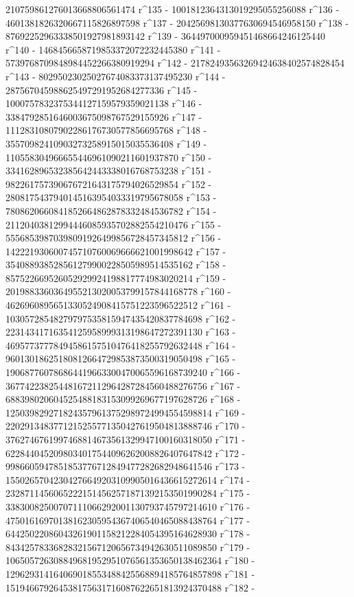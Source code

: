        210759861276013668806561474 r^135 - 
       1001812364313019295055256088 r^136 - 
       4601381826320667115826897598 r^137 - 
       20425698130377630694546958150 r^138 - 
       87692252963338501927981893142 r^139 - 
       364497000959451468664246125440 r^140 - 
       1468456658719853372072232445380 r^141 - 
       5739768709848984452266380919294 r^142 - 
       21782493563269424638402574828454 r^143 - 
       80295023025027674083373137495230 r^144 - 
       287567045988625497291952684277336 r^145 - 
       1000757832375344127159579359021138 r^146 - 
       3384792851646003675098767529155926 r^147 - 
       11128310807902286176730577856695768 r^148 - 
       35570982410903273258915015035536408 r^149 - 
       110558304966655446961090211601937870 r^150 - 
       334162896532385642443338016768753238 r^151 - 
       982261757390676721643175794026529854 r^152 - 
       2808175437940145163954033319795678058 r^153 - 
       7808620660841852664862878332484536782 r^154 - 
       21120403812994446085935702882554210476 r^155 - 
       55568539870398091926499856728457345812 r^156 - 
       142221930600745710760069666621001998642 r^157 - 
       354088938528561279900228505989514535162 r^158 - 
       857522669526052929924198817774983020214 r^159 - 
       2019883360364955213020053799157844168778 r^160 - 
       4626960895651330524908415751223596522512 r^161 - 
       10305728548279797535815947435420837784698 r^162 - 
       22314341716354125958999313198647272391130 r^163 - 
       46957737778494586157510476418255792632448 r^164 - 
       96013018625180812664729853873500319050498 r^165 - 
       190687760786864419663300470065596168739240 r^166 - 
       367742238254481672112964287284560488276756 r^167 - 
       688398020604525488183153099269677197628726 r^168 - 
       1250398292718243579613752989724994554598814 r^169 - 
       2202913483771215255771350427619504813888746 r^170 - 
       3762746761997468814673561329947100160318050 r^171 - 
       6228440452098034017544096262008826407647842 r^172 - 
       9986605947851853776712849477282682948641546 r^173 - 
       15502657042304276649203109905016436615272614 r^174 - 
       23287114560652221514562571871392153501990284 r^175 - 
       33830082500707111066292001130793745797214610 r^176 - 
       47501616970138162305954367406540465088438764 r^177 - 
       64425022086043261901158212284054395164628930 r^178 - 
       84342578336828321567120656734942630511089850 r^179 - 
       106505726308849681952951076561353650138462364 r^180 - 
       129629314164069018553488425568894185764857898 r^181 - 
       151946679264538175631716087622651813924370488 r^182 - 
